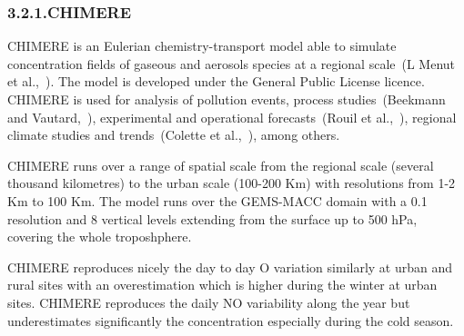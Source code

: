 \documentclass[9pt]{report}
\begin{document}
\begin{table}[h!]
\begin{mdbmarginx}{}{}{}{}
\begin{mdcenter}
{{%
\mdhr{}%

\noindent{}%
}}%
\end{mdcenter}\label{models-2}%
\end{mdbmarginx}%
\end{table}%

\subsubsection{3.2.1.\hspace*{0.5em}CHIMERE}\label{sec-chimere}%

\noindent{}CHIMERE is an Eulerian chemistry-transport model able to simulate concentration ﬁelds of gaseous and aerosols species at a regional scale~(L Menut et al.,~).
The model is developed under the General Public License licence. CHIMERE is used for analysis of pollution events, process studies~(Beekmann and Vautard,~), experimental and operational forecasts~(Rouil et al.,~), regional climate studies and trends~(Colette et al.,~), among others.%

CHIMERE runs over a range of spatial scale from the regional scale (several thousand kilometres) to the urban scale (100-200 Km) with resolutions from 1-2 Km to 100 Km.
The model runs over the GEMS-MACC domain with a 0.1\textdegree{} resolution and 8 vertical levels extending from the surface up to 500 hPa, covering the whole troposhphere.%

CHIMERE reproduces nicely the day to day O variation similarly at urban and rural sites with an overestimation which is higher during the winter at urban sites.
CHIMERE reproduces the daily NO variability along the year but underestimates significantly the concentration especially during the cold season.%
\end{document}
